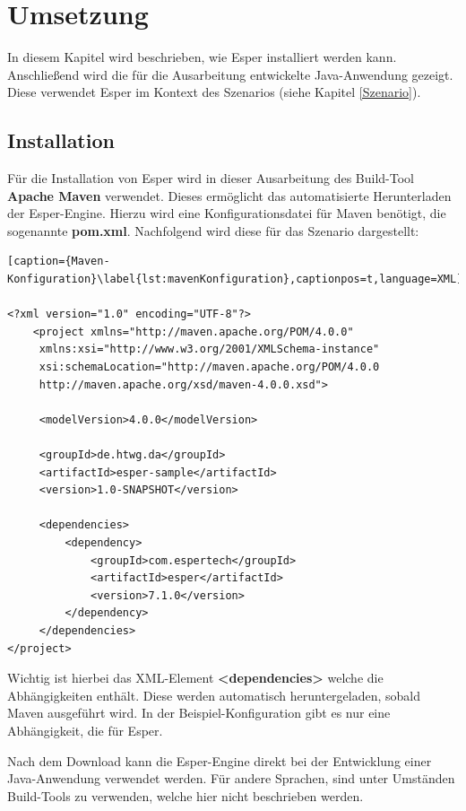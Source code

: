 \chapter{Umsetzung}
In diesem Kapitel wird beschrieben, wie Esper installiert werden kann. Anschließend wird die für die Ausarbeitung entwickelte Java-Anwendung gezeigt. Diese verwendet Esper im Kontext des Szenarios (siehe Kapitel \ref{Szenario}).

\section{Installation}
Für die Installation von Esper wird in dieser Ausarbeitung des Build-Tool \textbf{Apache Maven} verwendet. 
Dieses ermöglicht das automatisierte Herunterladen der Esper-Engine. Hierzu wird eine Konfigurationsdatei für Maven benötigt, die sogenannte \textbf{pom.xml}. Nachfolgend wird diese für das Szenario dargestellt:

\begin{lstlisting}[caption={Maven-Konfiguration}\label{lst:mavenKonfiguration},captionpos=t,language=XML]

<?xml version="1.0" encoding="UTF-8"?>
    <project xmlns="http://maven.apache.org/POM/4.0.0"
     xmlns:xsi="http://www.w3.org/2001/XMLSchema-instance"
     xsi:schemaLocation="http://maven.apache.org/POM/4.0.0
     http://maven.apache.org/xsd/maven-4.0.0.xsd">
		
     <modelVersion>4.0.0</modelVersion>

     <groupId>de.htwg.da</groupId>
     <artifactId>esper-sample</artifactId>
     <version>1.0-SNAPSHOT</version>

     <dependencies>
         <dependency>
             <groupId>com.espertech</groupId>
             <artifactId>esper</artifactId>
             <version>7.1.0</version>
         </dependency>
     </dependencies>
</project>
\end{lstlisting}

Wichtig ist hierbei das XML-Element \textbf{<dependencies>} welche die Abhängigkeiten enthält. Diese werden automatisch heruntergeladen, sobald Maven ausgeführt wird. In der Beispiel-Konfiguration gibt es nur eine Abhängigkeit, die für Esper.

Nach dem Download kann die Esper-Engine direkt bei der Entwicklung einer Java-Anwendung verwendet werden. Für andere Sprachen, sind unter Umständen Build-Tools zu verwenden, welche hier nicht beschrieben werden.

